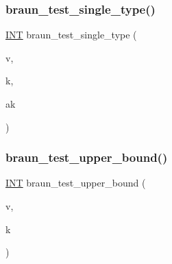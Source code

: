 \mbox{\label{_l_i_b_2_i_n_c_i_d_e_n_c_e_2packing_8_c_a26142039e77b4e4ba12148f78ec7ae36}} 
\subsubsection{\texorpdfstring{braun\+\_\+test\+\_\+single\+\_\+type()}{braun\_test\_single\_type()}}
{\footnotesize\ttfamily \mbox{\hyperlink{galois_8h_a09fddde158a3a20bd2dcadb609de11dc}{I\+NT}} braun\+\_\+test\+\_\+single\+\_\+type (\begin{DoxyParamCaption}\item[{\mbox{\hyperlink{galois_8h_a09fddde158a3a20bd2dcadb609de11dc}{I\+NT}}}]{v,  }\item[{\mbox{\hyperlink{galois_8h_a09fddde158a3a20bd2dcadb609de11dc}{I\+NT}}}]{k,  }\item[{\mbox{\hyperlink{galois_8h_a09fddde158a3a20bd2dcadb609de11dc}{I\+NT}}}]{ak }\end{DoxyParamCaption})}

\mbox{\label{_l_i_b_2_i_n_c_i_d_e_n_c_e_2packing_8_c_a86e20ed46d2cd22bd8604ea8861afa1f}} 
\subsubsection{\texorpdfstring{braun\+\_\+test\+\_\+upper\+\_\+bound()}{braun\_test\_upper\_bound()}}
{\footnotesize\ttfamily \mbox{\hyperlink{galois_8h_a09fddde158a3a20bd2dcadb609de11dc}{I\+NT}} braun\+\_\+test\+\_\+upper\+\_\+bound (\begin{DoxyParamCaption}\item[{\mbox{\hyperlink{galois_8h_a09fddde158a3a20bd2dcadb609de11dc}{I\+NT}}}]{v,  }\item[{\mbox{\hyperlink{galois_8h_a09fddde158a3a20bd2dcadb609de11dc}{I\+NT}}}]{k }\end{DoxyParamCaption})}

